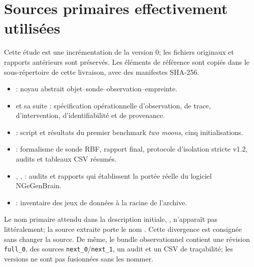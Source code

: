 \documentclass[11pt,a4paper,oneside]{report}
\begin{document}
\section{Sources primaires effectivement utilisées}
Cette étude est une incrémentation de la version 0; les fichiers originaux et rapports antérieurs sont préservés. Les éléments de référence sont copiés dans le sous-répertoire  de cette livraison, avec des manifestes SHA-256.
\begin{itemize}
\item {} : noyau abstrait objet--sonde--observation--empreinte.
\item {} et sa suite : spécification opérationnelle d'observation, de trace, d'intervention, d'identifiabilité et de provenance.
\item {} : script et résultats du premier benchmark \emph{two moons}, cinq initialisations.
\item {} : formalisme de sonde RBF, rapport final, protocole d'isolation stricte v1.2, audits et tableaux CSV résumés.
\item {}, ,  : audits et rapports qui établissent la portée réelle du logiciel NGeGenBrain.
\item {} : inventaire des jeux de données à la racine de l'archive.
\end{itemize}

Le nom primaire attendu dans la description initiale, , n'apparaît pas littéralement; la source extraite porte le nom . Cette divergence est consignée sans changer la source. De même, le bundle observationnel contient une révision \texttt{full\_0}, des sources \texttt{next\_0}/\texttt{next\_1}, un audit et un CSV de traçabilité; les versions ne sont pas fusionnées sans les nommer.
\end{document}
